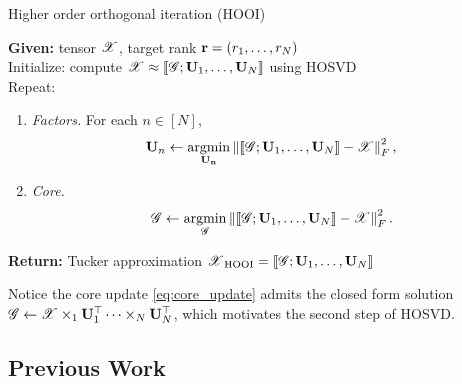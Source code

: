 \begin{algorithm}[ht]
	\caption{Higher order orthogonal iteration (HOOI)
	\cite{de2000multilinear}
	\label{alg:hooi}}
	\textbf{Given:} tensor $\T{X}$, target rank $\mathbf{r} = (r_1, \ldots, r_N)$ \\
	Initialize: compute $\T{X} \approx \llbracket\T{G}; \M{U}_1, \ldots, \M{U}_N \rrbracket$ using HOSVD \\
	Repeat:
\begin{enumerate}
	\item \emph{Factors.} For each $n \in [N]$,
	\begin{equation}
	\label{eq:factor-update}
	\mathbf{U}_n \leftarrow \argmin_{ \M{U_n} }
	\left\| \llbracket\T{G}; \M{U}_1, \ldots, \M{U}_N \rrbracket - \T{X} \right\|_F^2,
	\end{equation}
	\item \emph{Core.}
	\begin{equation}
	\label{eq:core_update}
	\T{G} \leftarrow \argmin_{\T{G}} %
	\left\| \llbracket\T{G}; \M{U}_1, \ldots, \M{U}_N \rrbracket - \T{X} \right\|_F^2.
	\end{equation}
\end{enumerate}
\textbf{Return:} Tucker approximation $\T{X}_{\rm{HOOI}} = \llbracket\T{G}; \M{U}_1, \ldots, \M{U}_N \rrbracket$
\end{algorithm}
Notice the core update \eqref{eq:core_update}
admits the closed form solution
$\T{G} \leftarrow \T{X}\times_1 \mathbf{U}_1^\top \cdots \times_N \mathbf{U}_N^\top$,
which motivates the second step of HOSVD.

\subsection{Previous Work}\label{sec: previous_work}



